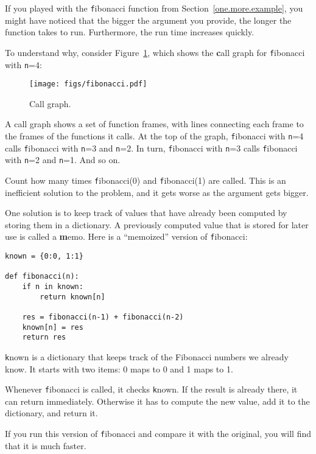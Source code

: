 \documentclass[
DIV=11,
fontsize=12,
twoside,
headinclude=false,
titlepage=firstiscover,
abstract=true,
headsepline=true,
footsepline=true,
chapterprefix=true, %
headings=big,
bibliography=totoc,%
captions=tableheading
]{scrbook}
\theoremstyle{definition}
\begin{document}
If you played with the {\texttt fibonacci} function from
Section~\ref{one.more.example}, you might have noticed that the bigger
the argument you provide, the longer the function takes to run.
Furthermore, the run time increases quickly.

To understand why, consider Figure~\ref{fig.fibonacci}, which shows
the {\textbf call graph} for {\texttt fibonacci} with {\texttt n=4}:

\begin{figure}
\centerline
{\texttt{[image: figs/fibonacci.pdf]}}
\caption{Call graph.}
\label{fig.fibonacci}
\end{figure}

A call graph shows a set of function frames, with lines connecting each
frame to the frames of the functions it calls.  At the top of the
graph, {\texttt fibonacci} with {\texttt n=4} calls {\texttt fibonacci} with {\texttt
n=3} and {\texttt n=2}.  In turn, {\texttt fibonacci} with {\texttt n=3} calls
{\texttt fibonacci} with {\texttt n=2} and {\texttt n=1}.  And so on.

Count how many times {\texttt fibonacci(0)} and {\texttt fibonacci(1)} are
called.  This is an inefficient solution to the problem, and it gets
worse as the argument gets bigger.

One solution is to keep track of values that have already been
computed by storing them in a dictionary.  A previously computed value
that is stored for later use is called a {\textbf memo}.  Here is a
``memoized'' version of {\texttt fibonacci}:

\begin{lstlisting}
known = {0:0, 1:1}

def fibonacci(n):
    if n in known:
        return known[n]

    res = fibonacci(n-1) + fibonacci(n-2)
    known[n] = res
    return res
\end{lstlisting}
%
{\texttt known} is a dictionary that keeps track of the Fibonacci
numbers we already know.  It starts with
two items: 0 maps to 0 and 1 maps to 1.

Whenever {\texttt fibonacci} is called, it checks {\texttt known}.
If the result is already there, it can return
immediately.  Otherwise it has to 
compute the new value, add it to the dictionary, and return it.

If you run this version of {\texttt fibonacci} and compare it with
the original, you will find that it is much faster.
\end{document}
